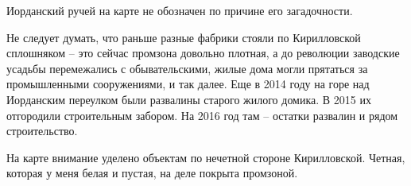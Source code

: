Иорданский ручей на карте не обозначен по причине его загадочности.

Не следует думать, что раньше разные фабрики стояли по Кирилловской сплошняком – это сейчас промзона довольно плотная, а до революции заводские усадьбы перемежались с обывательскими, жилые дома могли прятаться за промышленными сооружениями, и так далее. Еще в 2014 году на горе над Иорданским переулком были развалины старого жилого домика. В 2015 их отгородили строительным забором. На 2016 год там – остатки развалин и рядом строительство.

На карте внимание уделено объектам по нечетной стороне Кирилловской. Четная, которая у меня белая и пустая, на деле покрыта промзоной.
